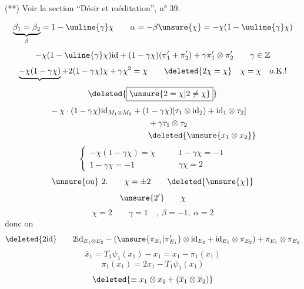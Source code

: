 (**) Voir la section ``Désir et méditation'', n° 39.

\[
\underbrace{\beta_1=\beta_2}_{\beta}=1-\uuline{\gamma}\chi
\qquad
\alpha=-\beta\unsure{\chi}=-\chi(1-\uuline{\gamma}\chi)
\]
\[
-\chi(1-\uline{\gamma}\chi)\mathrm{id}
+(1-\gamma\chi)(\pi'_1+\pi'_2)+\gamma\pi'_1\otimes\pi'_2
\qquad\gamma\in\mathbb Z
\]
\[
\underbrace{-\chi(1-\gamma\chi)}+2(1-\gamma\chi)\chi+\gamma\chi^2=\chi
\qquad\deleted{2\chi=\chi}\quad\chi=\chi\quad\text{o.K.!}
\]
\[
\deleted{\boxed{\unsure{2=\chi|2\ne\chi}}}
\]
\[
\begin{aligned}
&-\chi\cdot(1-\gamma\chi)\mathrm{id}_{M_1\otimes M_2}
+(1-\gamma\chi)[\tau_1\otimes\mathrm{id}_2)+\mathrm{id}_1\otimes\tau_2]\\
&\hspace{12em}+\gamma\tau_1\otimes\tau_2\\
&\hspace{12em}\deleted{\unsure{x_1\otimes x_2}}
\end{aligned}
\]
\[
\left\{\begin{array}{l}
-\chi(1-\gamma\chi)=\chi\\1-\gamma\chi=-1
\end{array}\right.
\qquad
\begin{array}{c}1-\gamma\chi=-1\\\boxed{\gamma\chi=2}\end{array}
\]
\[
\text{\unsure{ou} }2.\qquad\chi=\pm2
\qquad\deleted{\unsure{\chi}}
\]
\[
\unsure{2'}\qquad\chi
\]
\[
\chi=2\qquad\gamma=1\quad,\ \beta=-1,\ \alpha=2
\]
donc on 
\[
\deleted{2\mathrm{id}}\qquad
2\mathrm{id}_{E_1\otimes E_2}
-(\unsure{\pi_{E_1}|\pi'_{E_1}}\otimes\mathrm{id}_{E_2}
+\mathrm{id}_{E_1}\otimes\pi_{E_2})+\pi_{E_1}\otimes\pi_{E_2}
\]
\[
\overline{x}_1=T_1\psi_1(x_1)-x_1=x_1-\pi_1(x_1)
\]
\[
\pi_1(x_1)=2x_1-T_1\psi_1(x_1)
\]
\[
\deleted{\equiv x_1\otimes x_2+(\overline{x}_1\otimes\overline{x}_2)}
\]


